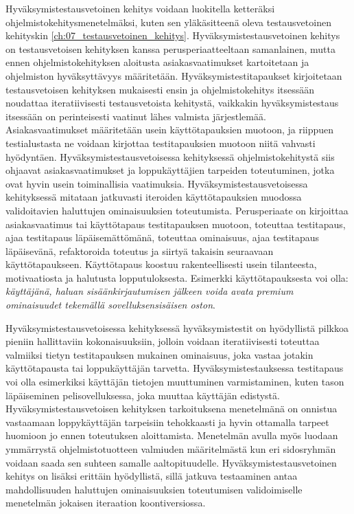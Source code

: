   Hyväksymistestausvetoinen kehitys voidaan luokitella ketteräksi ohjelmistokehitysmenetelmäksi, kuten sen yläkäsitteenä oleva testausvetoinen kehityskin \ref{ch:07_testausvetoinen_kehitys}.
  Hyväksymistestausvetoinen kehitys on testausvetoisen kehityksen kanssa perusperiaatteeltaan samanlainen, mutta ennen ohjelmistokehityksen aloitusta asiakasvaatimukset kartoitetaan ja ohjelmiston hyväksyttävyys määritetään.
  Hyväksymistestitapaukset kirjoitetaan testausvetoisen kehityksen mukaisesti ensin ja ohjelmistokehitys itsessään noudattaa iteratiivisesti testausvetoista kehitystä, vaikkakin hyväksymistestaus itsessään on perinteisesti vaatinut lähes valmista järjestlemää.
  Asiakasvaatimukset määritetään usein käyttötapauksien muotoon, ja riippuen testialustasta ne voidaan kirjottaa testitapauksien muotoon niitä vahvasti hyödyntäen.
  Hyväksymistestausvetoisessa kehityksessä ohjelmistokehitystä siis ohjaavat asiakasvaatimukset ja loppukäyttäjien tarpeiden toteutuminen, jotka ovat hyvin usein toiminallisia vaatimuksia.
  Hyväksymistestausvetoisessa kehityksessä mitataan jatkuvasti iteroiden käyttötapauksien muodossa validoitavien haluttujen ominaisuuksien toteutumista.
  Perusperiaate on kirjoittaa asiakasvaatimus tai käyttötapaus testitapauksen muotoon, toteuttaa testitapaus, ajaa testitapaus läpäisemättömänä, toteuttaa ominaisuus, ajaa testitapaus läpäisevänä, refaktoroida toteutus ja siirtyä takaisin seuraavaan käyttötapaukseen.
  Käyttötapaus koostuu rakenteellisesti usein tilanteesta, motivaatiosta ja halutusta lopputuloksesta.
  Esimerkki käyttötapauksesta voi olla: \emph{käyttäjänä, haluan sisäänkirjautumisen jälkeen voida avata premium ominaisuudet tekemällä sovelluksensisäisen oston}.

  Hyväksymistestausvetoisessa kehityksessä hyväksymistestit on hyödyllistä pilkkoa pieniin hallittaviin kokonaisuuksiin, jolloin voidaan iteratiivisesti toteuttaa valmiiksi tietyn testitapauksen mukainen ominaisuus, joka vastaa jotakin käyttötapausta tai loppukäyttäjän tarvetta.
  Hyväksymistestauksessa testitapaus voi olla esimerkiksi käyttäjän tietojen muuttuminen varmistaminen, kuten tason läpäiseminen pelisovelluksessa, joka muuttaa käyttäjän edistystä.
  Hyväksymistestausvetoisen kehityksen tarkoituksena menetelmänä on onnistua vastaamaan loppykäyttäjän tarpeisiin tehokkaasti ja hyvin ottamalla tarpeet huomioon jo ennen toteutuksen aloittamista.
  Menetelmän avulla myös luodaan ymmärrystä ohjelmistotuotteen valmiuden määritelmästä kun eri sidosryhmän voidaan saada sen suhteen samalle aaltopituudelle.
  Hyväksymistestausvetoinen kehitys on lisäksi erittäin hyödyllistä, sillä jatkuva testaaminen antaa mahdollisuuden haluttujen ominaisuuksien toteutumisen validoimiselle menetelmän jokaisen iteraation koontiversiossa.

